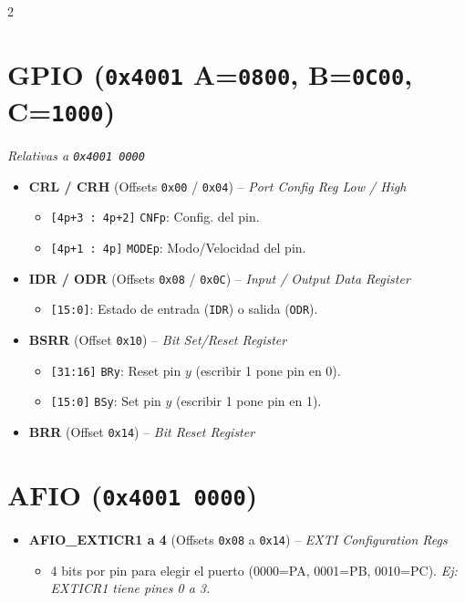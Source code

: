 \documentclass[10pt,a4paper]{article}
\begin{document}
\begin{multicols*}{2}
\section*{GPIO (\texttt{0x4001} A=\texttt{0800}, B=\texttt{0C00}, C=\texttt{1000})}
\textit{Relativas a \texttt{0x4001 0000}}
\begin{itemize}
    \item \textbf{CRL / CRH} (Offsets \texttt{0x00} / \texttt{0x04}) -- \textit{Port Config Reg Low / High}
    \begin{itemize}
        \item \texttt{[4p+3 : 4p+2]} \texttt{CNFp}: Config. del pin.
        \item \texttt{[4p+1 : 4p]} \texttt{MODEp}: Modo/Velocidad del pin.
    \end{itemize}
    \item \textbf{IDR / ODR} (Offsets \texttt{0x08} / \texttt{0x0C}) -- \textit{Input / Output Data Register}
    \begin{itemize}
        \item \texttt{[15:0]}: Estado de entrada (\texttt{IDR}) o salida (\texttt{ODR}).
    \end{itemize}
    \item \textbf{BSRR} (Offset \texttt{0x10}) -- \textit{Bit Set/Reset Register}
    \begin{itemize}
        \item \texttt{[31:16]} \texttt{BRy}: Reset pin $y$ (escribir 1 pone pin en 0).
        \item \texttt{[15:0]} \texttt{BSy}: Set pin $y$ (escribir 1 pone pin en 1).
    \end{itemize}
    \item \textbf{BRR} (Offset \texttt{0x14}) -- \textit{Bit Reset Register}
\end{itemize}

\section*{AFIO (\texttt{0x4001 0000})}
\begin{itemize}
    \item \textbf{AFIO\_EXTICR1 a 4} (Offsets \texttt{0x08} a \texttt{0x14}) -- \textit{EXTI Configuration Regs}
    \begin{itemize}
        \item 4 bits por pin para elegir el puerto (0000=PA, 0001=PB, 0010=PC). \textit{Ej: EXTICR1 tiene pines 0 a 3.}
    \end{itemize}
\end{itemize}


\end{multicols*}
\end{document}
